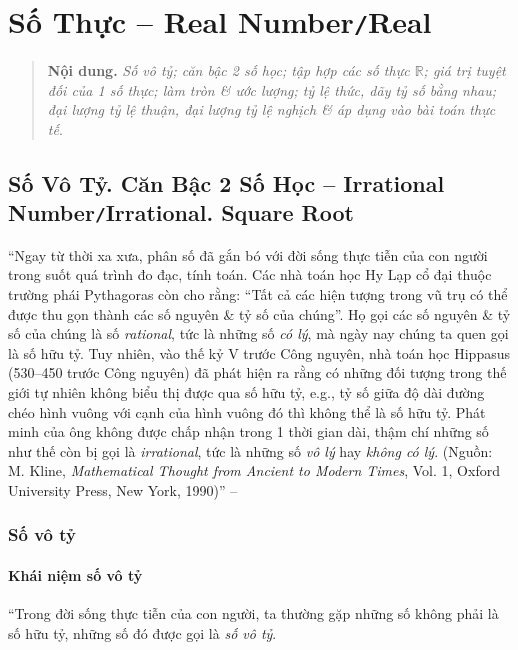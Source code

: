 \documentclass[oneside]{book}
\numberwithin{equation}{section}
\begin{document}
\chapter{Số Thực -- Real Number\texttt{/}Real}

\begin{quotation}
	\textbf{Nội dung.} \textit{Số vô tỷ; căn bậc 2 số học; tập hợp các số thực $\mathbb{R}$; giá trị tuyệt đối của 1 số thực; làm tròn \& ước lượng; tỷ lệ thức, dãy tỷ số bằng nhau; đại lượng tỷ lệ thuận, đại lượng tỷ lệ nghịch \& áp dụng vào bài toán thực tế}.
\end{quotation}

\section{Số Vô Tỷ. Căn Bậc 2 Số Học -- Irrational Number\texttt{/}Irrational. Square Root}
``Ngay từ thời xa xưa, phân số đã gắn bó với đời sống thực tiễn của con người trong suốt quá trình đo đạc, tính toán. Các nhà toán học Hy Lạp cổ đại thuộc trường phái Pythagoras còn cho rằng: ``Tất cả các hiện tượng trong vũ trụ có thể được thu gọn thành các số nguyên \& tỷ số của chúng''. Họ gọi các số nguyên \& tỷ số của chúng là số \textit{rational}, tức là những số \textit{có lý}, mà ngày nay chúng ta quen gọi là số hữu tỷ. Tuy nhiên, vào thế kỷ V trước Công nguyên, nhà toán học Hippasus (530--450 trước Công nguyên) đã phát hiện ra rằng có những đối tượng trong thế giới tự nhiên không biểu thị được qua số hữu tỷ, e.g., tỷ số giữa độ dài đường chéo hình vuông với cạnh của hình vuông đó thì không thể là số hữu tỷ. Phát minh của ông không được chấp nhận trong 1 thời gian dài, thậm chí những số như thế còn bị gọi là \textit{irrational}, tức là những số \textit{vô lý} hay \textit{không có lý}. (Nguồn: M. Kline, \textit{Mathematical Thought from Ancient to Modern Times}, Vol. 1, Oxford University Press, New York, 1990)''  -- \cite[p. 32]{SGK_Toan_7_Canh_Dieu_tap_1}

\subsection{Số vô tỷ}

\subsubsection{Khái niệm số vô tỷ}
``Trong đời sống thực tiễn của con người, ta thường gặp những số không phải là số hữu tỷ, những số đó được gọi là \textit{số vô tỷ}.
\end{document}
